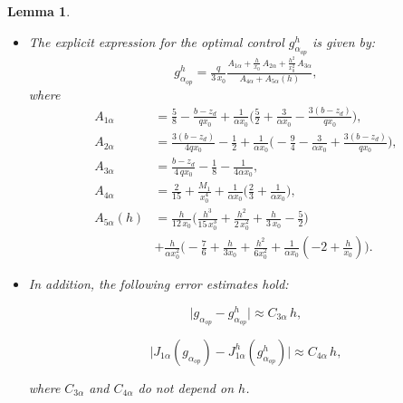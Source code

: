 \documentclass[11pt]{article}
\newtheorem{Lemma}{Lemma}
\begin{document}
   \begin{Lemma} $ $
   
    
    \begin{itemize}
     \item[(a)] The explicit expression for the optimal { control $g^h_{\alpha_{op}}$} is given by: 
      \begin{equation}\label{galphaoph}
     {g^h_{\alpha_{op}}} = \tfrac{q}{3\,x_0} \tfrac{A_{1\alpha} + \tfrac{h}{x_0}\,A_{2\alpha} + \tfrac{h^2}{x_0^2}\, A_{3\alpha}}{A_{4\alpha} + A_{5\alpha}(h)},
      \end{equation}
  where
\begin{equation}\label{Aialpha}
\begin{array}{rl}
A_{1\alpha}&=\tfrac{5}{8} - \tfrac{b- z_d}{qx_0}+\tfrac{1}{\alpha x_0}\bigg(\tfrac{5}{2}+\tfrac{3}{\alpha x_0}-\tfrac{3(b-z_d)}{ q x_0}\bigg), \\[0.35cm]
 A_{2\alpha}&=\tfrac{3 (b-z_d)}{4 q x_0}  -\tfrac{1}{2}+\tfrac{1}{\alpha x_0}\bigg(-\tfrac{9}{4}-\tfrac{3}{\alpha x_0}+\tfrac{3(b-z_d)}{qx_0} \bigg),  \\[0.35cm]
  A_{3\alpha}&=  \tfrac{b-z_d}{4\,qx_0} - \tfrac{1}{8}-\tfrac{1}{4\alpha x_0}, \\[0.35cm] 
   A_{4\alpha} &= \tfrac{2}{15} + \tfrac{M_1}{x_0^4}+\tfrac{1}{\alpha x_0}\bigg( \tfrac{2}{3}+\tfrac{1}{\alpha x_0}\bigg),\\[0.35cm]
   A_{5\alpha}(h) &=  \tfrac{h}{12\,x_0} \Big( \tfrac{h^3}{15\, x_0^3} + \tfrac{h^2}{2 \, x_0^2} + \tfrac{h}{3\,x_0} - \tfrac{5}{2} \Big)\\
    &+\tfrac{h}{\alpha x_0^2}\bigg( -\tfrac{7}{6}+\tfrac{h}{3x_0}+\tfrac{h^2}{6x_0^2}+\tfrac{1}{\alpha x_0}\left( -2+\tfrac{h}{x_0}\right)\bigg).
\end{array}
\end{equation}  	  
    
     \item[(b)]In addition, the following error estimates hold:

  \begin{equation}\label{resta ghalphaop-galphaop}
    				      \lvert g_{\alpha_{op}} -      {g^h_{\alpha_{op}}}\rvert \approx C_{3\alpha} \, h, 
    				  \end{equation}
    
\begin{equation}\label{dif J1alpha}
    				     \Big \lvert J_{1\alpha}(g_{\alpha_{op}}) -      { J_{1\alpha}^h(g^h_{\alpha_{op}})} \Big \rvert \approx C_{4\alpha} \, h ,
    				\end{equation}
    
    where  $C_{3\alpha}$  and $C_{4\alpha}$ do not depend on  $h$.
   
    \end{itemize}
    \end{Lemma}
    
\end{document}
